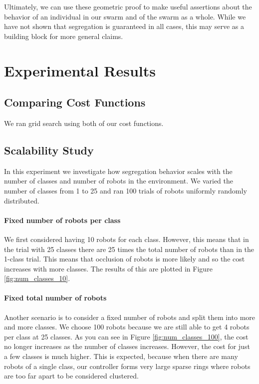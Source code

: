 \documentclass[conference]{IEEEtran}
\begin{document}
    Ultimately, we can use these geometric proof to make useful assertions about the behavior of an individual in our swarm and of the swarm as a whole. While we have not shown that segregation is guaranteed in all cases, this may serve as a building block for more general claims.

\section{Experimental Results}

  \subsection{Comparing Cost Functions} \label{section:evaluating_cost_functions}

    We ran grid search using both of our cost functions.

  \subsection{Scalability Study} \label{section:scalability}

    In this experiment we investigate how segregation behavior scales with the number of classes and number of robots in the environment. We varied the number of classes from 1 to 25 and ran 100 trials of robots uniformly randomly distributed.

    \paragraph{Fixed number of robots per class}

    We first considered having 10 robots for each class. However, this means that in the trial with 25 classes there are 25 times the total number of robots than in the 1-class trial. This means that occlusion of robots is more likely and so the cost increases with more classes. The results of this are plotted in Figure  \ref{fig:num_classes_10}.

    \paragraph{Fixed total number of robots}

    Another scenario is to consider a fixed number of robots and split them into more and more classes. We choose 100 robots because we are still able to get 4 robots per class at 25 classes. As you can see in Figure \ref{fig:num_classes_100}, the cost no longer increases as the number of classes increases. However, the cost for just a few classes is much higher. This is expected, because when there are many robots of a single class, our controller forms very large sparse rings where robots are too far apart to be considered clustered.
\end{document}
